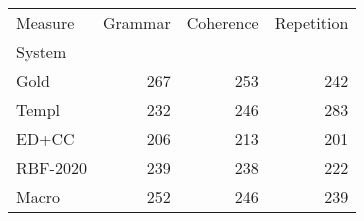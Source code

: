 \begin{tabular}{lrrr}
\toprule
Measure & Grammar & Coherence & Repetition \\
System &  &  &  \\
\midrule
Gold & 267 & 253 & 242 \\
Templ & 232 & 246 & 283 \\
ED+CC & 206 & 213 & 201 \\
RBF-2020 & 239 & 238 & 222 \\
Macro & 252 & 246 & 239 \\
\bottomrule
\end{tabular}
